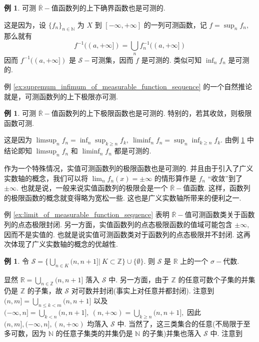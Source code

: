 \documentclass[12pt, a4paper, oneside]{book}
\numberwithin{figure}{section}
\theoremstyle{definition}
\newtheorem{example}[theorem]{例}
\begin{document}
\begin{example}\label{ex:supremum_infimum_of_measurable_function_sequence}
    可测 $\overline{\mathbb R}-$值函数列的上下确界函数也是可测的.
\end{example}
这是因为，设 $\{f_n\}_{n\in\mathbb N}$ 为 $X$ 到 $[-\infty,+\infty]$ 的一列可测函数，记 $f=\sup_n f_n,$
那么就有
\begin{equation}
    f^{-1}((a,+\infty])=\bigcup_n f_n^{-1}((a,+\infty])
\end{equation}
因而 $f^{-1}((a,+\infty])$ 是 $\mathcal S-$可测集，因而 $f$ 是可测的. 类似可知 $\inf_n f_n$ 是可测的.

例 \eqref{ex:supremum_infimum_of_measurable_function_sequence} 的一个自然推论就是，可测函数列的上下极限亦可测.
\begin{example}\label{ex:limit_of_measurable_function_sequence}
    可测 $\overline{\mathbb R}-$值函数列的上下极限函数也是可测的. 特别的，若其收敛，则极限函数可测.
\end{example}
这是因为 $\limsup_n f_n=\inf_n \sup_{k\geq n} f_k,\ \liminf_n f_n=\sup_n \inf_{k\geq n} f_k.$ 由例 \ref{ex:supremum_infimum_of_measurable_function_sequence} 中结论即知 $\limsup_n f_n$ 和 $\liminf_n f_n$ 都是可测的. 

作为一个特殊情况，实值可测函数列的极限函数也是可测的. 并且由于引入了广义实数轴的概念，我们可以将 $\lim_n f_n(x)=\pm\infty$ 的情形算作是 $f_n$ ``收敛''到了 $\pm\infty.$ 也就是说，一般来说实值函数列的极限会是一个 $\overline{\mathbb R}-$值函数. 
这样，函数列的极限函数的概念就变得略为宽松一些. 这也是广义实数轴所带来的便利之一.

例 \eqref{ex:limit_of_measurable_function_sequence} 表明 $\overline{\mathbb R}-$值可测函数类关于函数列的点态极限封闭. 另一方面，实值函数列的点态极限函数的值域可能包含 $\pm\infty,$ 因而不是实值的. 也就是说实值可测函数类对于函数列的点态极限并不封闭. 这再次体现了广义实数轴的概念的优越性.

\begin{example}\label{ex:sigma_algebra_partition}
    令 $\mathcal S=\{\bigcup_{n\in K}(n,n+1]|\ K\subset\mathbb Z\}\cup\{\emptyset\}.$ 则 $\mathcal S$ 是 $\mathbb R$ 上的一个 $\sigma-$代数.
\end{example}
显然 $\mathbb R=\bigcup_{n\in\mathbb Z}(n,n+1]$ 落入 $\mathcal S$ 中. 另一方面，由于 $\mathbb Z$ 的任意可数个子集的并集仍是 $\mathbb Z$ 的子集，故 
$\mathcal S$ 对可数并封闭(事实上对任意并都封闭).
注意到 
$(n,m]=\bigcup_{n\leq k<m}(n,n+1]$ 以及 $(-\infty,n]=\bigcup_{k<n}(n,n+1],\ (n,+\infty)=\bigcup_{k\geq n}(n,n+1],$ 因此 $(n,m],(-\infty,n],(n,+\infty)$ 均落入 $\mathcal S$ 中.
当然了，这三类集合的任意(不局限于至多可数，因为 $\mathbb N$ 的任意子集类的并集仍是 $\mathbb N$ 的子集)并集也落入 $\mathcal S$ 中. 注意到
\end{document}
